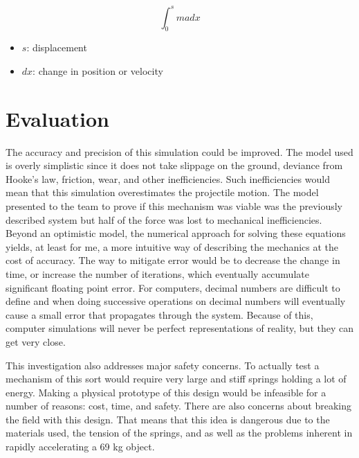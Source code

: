 \documentclass[12pt, letterpaper]{article}
\begin{document}
\begin{singlespace}
\begin{equation}
  \label{eq:workIntegral}
  \int_{0}^{s} m a dx
\end{equation}
\begin{small}
  \begin{itemize}[label=]
    \item $s$: displacement
    \item $dx$: change in position or velocity
  \end{itemize}
\end{small}
\end{singlespace}

\section{Evaluation}
The accuracy and precision of this simulation could be improved. The model used is overly simplistic
since it does not take slippage on the ground, deviance from Hooke's law, friction, wear, and other
inefficiencies. Such inefficiencies would mean that this simulation overestimates the projectile motion. The
model presented to the team to prove if this mechanism was viable was the previously described system but
half of the force was lost to mechanical inefficiencies. Beyond an optimistic model, the numerical approach
for solving these equations yields, at least for me, a more intuitive way of describing the mechanics at the
cost of accuracy. The way to mitigate error would be to decrease the change in time, or increase the number
of iterations, which eventually accumulate significant floating point error. For computers, decimal numbers
are difficult to define and when doing successive operations on decimal numbers will eventually cause a small
error that propagates through the system. Because of this, computer simulations will never be perfect
representations of reality, but they can get very close.

This investigation also addresses major safety concerns. To actually test a mechanism of this sort would
require very large and stiff springs holding a lot of energy. Making a physical prototype of this design 
would be infeasible for a number of reasons: cost, time, and safety. There are also concerns about breaking
the field with this design. That means that this idea is dangerous due to the materials used, the tension of
the springs, and as well as the problems inherent in rapidly accelerating a 69 kg object.
\end{document}
